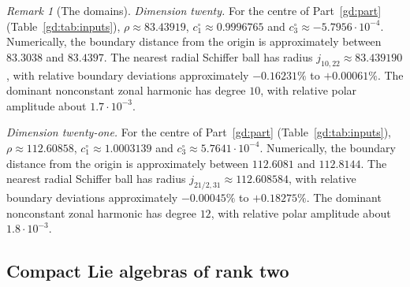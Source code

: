 \documentclass[11pt]{amsart}
\theoremstyle{definition}
\theoremstyle{remark}
\newtheorem{remark}[theorem]{Remark}
\numberwithin{equation}{section}
\begin{document}
\begin{remark}[The domains]
\emph{Dimension twenty.} For the centre of Part~\ref{gd:part} (Table~\ref{gd:tab:inputs}), $\rho\approx83.43919$, $c_1^\circ\approx0.9996765$ and $c_3^\circ\approx-5.7956\cdot10^{-4}$. Numerically, the boundary distance from the origin is approximately between $83.3038$ and $83.4397$. The nearest radial Schiffer ball has radius $j_{10,22}\approx83.439190$, with relative boundary deviations approximately $-0.16231\%$ to $+0.00061\%$. The dominant nonconstant zonal harmonic has degree $10$, with relative polar amplitude about $1.7\cdot10^{-3}$.

\emph{Dimension twenty-one.} For the centre of Part~\ref{gd:part} (Table~\ref{gd:tab:inputs}), $\rho\approx112.60858$, $c_1^\circ\approx1.0003139$ and $c_3^\circ\approx5.7641\cdot10^{-4}$. Numerically, the boundary distance from the origin is approximately between $112.6081$ and $112.8144$. The nearest radial Schiffer ball has radius $j_{21/2,31}\approx112.608584$, with relative boundary deviations approximately $-0.00045\%$ to $+0.18275\%$. The dominant nonconstant zonal harmonic has degree $12$, with relative polar amplitude about $1.8\cdot10^{-3}$.
\end{remark}

\subsection{Compact Lie algebras of rank two}\label{subsec:lie}
\end{document}
